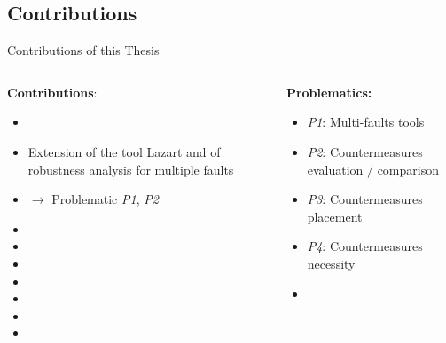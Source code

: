 \subsection{Contributions}

\begin{frame}[fragile]{Contributions of this Thesis}
\vfill
    \begin{small}
        \begin{columns}
            \begin{column}{0.5\textwidth}    
                \textbf{Contributions}:
                \begin{itemize}
                    \item[]
                    \item Extension of the tool Lazart and of robustness analysis for multiple faults
                    \item [] $\rightarrow$ Problematic \textit{P1}, \textit{P2}
                    \item[]
                    \item {}
                    \item[] 
                    \item []
                    \item {}
                    \item [] 
                    \item[] 
                \end{itemize}
                
                \vfill
            
            \end{column}
            \begin{column}{0.5\textwidth}
                \textbf{Problematics:}
                \begin{itemize}
                    \item  \textit{P1}: Multi-faults tools
                    \item  \textit{P2}: Countermeasures evaluation / comparison
                    \item  \textit{P3}: Countermeasures placement
                    \item  \textit{P4}: Countermeasures necessity
                    \item[] 
                \end{itemize}
                
            \end{column}
        \end{columns}        
    \end{small}
\end{frame}
